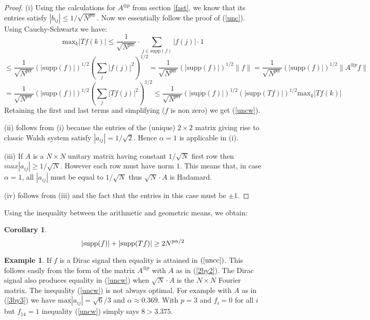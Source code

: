 \documentclass[11pt]{amsart}
\newtheorem{corollary}[theorem]{Corollary}
\theoremstyle{definition}
\newtheorem{remark}[theorem]{Remark}
\newtheorem{example}[theorem]{Example}
\theoremstyle{remark}
\numberwithin{equation}{section}
\newcommand{\suport}{\textup{supp}}
\begin{document}
\begin{proof}
(i) Using the calculations for $A^{\otimes p}$ from section \ref{fast}, we know that its entries satisfy  $|b_{ij}|\leq 1/\sqrt{N^{p\alpha}} $. Now we essentially follow the proof of (\ref{unc}). Using Cauchy-Schwartz we have:
$$ \text{max}_{k}|Tf(k)|\leq \frac{1}{\sqrt{N^{p\alpha}}}\cdot \sum_{j\in\text{supp}(f) }|f(j)|\cdot 1 $$
$$ \leq  \frac{1}{\sqrt{N^{p\alpha}}} ( |\text{supp}(f)|)^{1/2}(\sum_{j}|f(j)|^2)^{1/2}=    \frac{1}{\sqrt{N^{p\alpha}}} ( |\text{supp}(f)|)^{1/2}\|f\|= \frac{1}{\sqrt{N^{p\alpha}}} ( |\text{supp}(f)|)^{1/2}\|A^{\otimes p}f\|$$
$$=\frac{1}{\sqrt{N^{p\alpha}}} ( |\text{supp}(f)|)^{1/2}(\sum_j |Tf(j)|^2)^{1/2}\leq \frac{1}{\sqrt{N^{p\alpha}}} ( |\text{supp}(f)|)^{1/2}( |\text{supp}(Tf)|)^{1/2} \text{max}_{k}|Tf(k)|$$
Retaining the first and last terms and simplifying ($f$ is non zero)  we get (\ref{uncw}).

(ii) follows from (i)  because the entries of the (unique) $2\times 2$ matrix giving rise to classic Walsh system satisfy  $|a_{ij}|=1/\sqrt{2}$. Hence $\alpha=1$ is applicable in (i).


(iii) If $A$ is a $N\times N$ unitary matrix having constant $1/\sqrt{N}$ first row then $max|a_{ij}|\geq 1/\sqrt{N}$. However each row must have norm $1$. This means that, in case $\alpha=1$, all  $|a_{ij}|$ must be equal to $1/\sqrt{N}$ thus $\sqrt{N}\cdot A$ is Hadamard.

(iv) follows from (iii) and the fact that the entries in this case must be $\pm{1}$.
\end{proof}

Using the inequality between the arithmetic and geometric means, we obtain:
\begin{corollary}
$$|\suport(f)|+ |\suport(Tf)|\geq 2 N^{p\alpha/2}$$
\end{corollary}

%


\begin{example} If $f$ is a  Dirac signal then equality is attained in $(\ref{uncc})$. This follows easily from the form of the matrix $A^{\otimes p}$ with $A$ as in (\ref{2by2}). The Dirac signal also produces equality in  (\ref{uncw}) when $\sqrt{N}\cdot A$ is the $N\times N$ Fourier matrix. The inequality (\ref{uncw}) is not always optimal. For example with $A$ as in (\ref{3by3}) we have $\text{max}|a_{ij}|=\sqrt{6}/3$ and $\alpha\approx 0.369$. With $p=3$ and $f_i=0$ for all $i$ but $f_{14}=1$ inequality (\ref{uncw}) simply says $8>3.375$.
\end{example}
\end{document}
